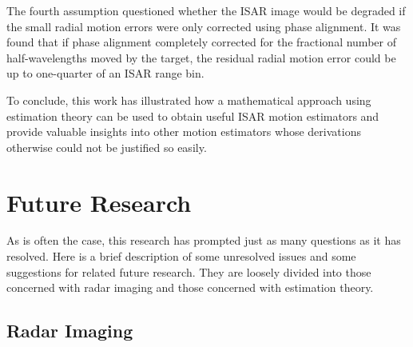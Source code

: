 The fourth assumption questioned whether the ISAR image would be degraded
if the small radial motion errors were only corrected using phase
alignment. It was found that if phase alignment completely corrected for
the fractional number of half-wavelengths moved by the target, the residual
radial motion error could be up to one-quarter of an ISAR range bin.

To conclude, this work has illustrated how a mathematical approach using
estimation theory can be used to obtain useful ISAR motion estimators and
provide valuable insights into other motion estimators whose derivations
otherwise could not be justified so easily.

\section{Future Research}

As is often the case, this research has prompted just as many questions as
it has resolved.  Here is a brief description of some unresolved issues and
some suggestions for related future research.  They are loosely divided
into those concerned with radar imaging and those concerned with estimation
theory.

\subsection{Radar Imaging}


